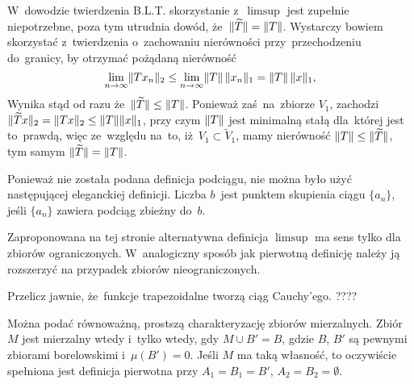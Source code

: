 \documentclass[a4paper,11pt]{article}
\numberwithin{equation}{section}
\begin{document}
\VerSpaceFour





\noindent
{} W~dowodzie twierdzenia B.L.T. skorzystanie z~$\limsup$
jest zupełnie niepotrzebne, poza tym utrudnia dowód,
że~$\Vert \widetilde{ T } \Vert = \lVert{  T  }\rVert$. Wystarczy bowiem skorzystać
z~twierdzenia o~zachowaniu nierówności przy~przechodzeniu do~granicy,
by otrzymać pożądaną nierówność
\begin{equation}
  \label{eq:RS-Vol-I-s01-13}
  \lim\limits_{ n \to \infty } \lVert{  T x_{ n }  }\rVert_{ 2 }
  \leq \lim\limits_{ n \to \infty } \lVert{  T  }\rVert \, \lVert{  x_{ n }  }\rVert_{ 1 }
  = \lVert{  T  }\rVert \, \lVert{  x  }\rVert_{ 1 },
\end{equation}
Wynika stąd od razu że~$\Vert \widetilde{ T } \Vert \leq \lVert{  T  }\rVert$. Ponieważ
zaś~na~zbiorze $V_{ 1 }$, zachodzi
$\Vert \widetilde{ T } x \Vert_{ 2 } = \lVert{  T x  }\rVert_{ 2 } \leq \lVert{  T  }\rVert \lVert{  x
 }\rVert_{ 1 }$, przy czym $\lVert{  T  }\rVert$ jest minimalną stałą dla~której jest
to~prawdą, więc ze~względu na~to, iż~$V_{ 1 } \subset \widetilde{ V }_{ 1 }$,
mamy nierówność $\lVert{  T  }\rVert \leq \Vert \widetilde{ T } \Vert$, tym samym
$\Vert \widetilde{ T } \Vert = \lVert{  T  }\rVert$. %

\VerSpaceFour





\noindent
{} Ponieważ nie została podana definicja podciągu, nie
można było użyć następującej eleganckiej definicji. Liczba $b$~jest
punktem skupienia ciągu $\{ a_{ n } \}$, jeśli $\{ a_{ n } \}$ zawiera
podciąg zbieżny do~$b$. %

\VerSpaceFour





\noindent
{} Zaproponowana na tej stronie alternatywna definicja
$\limsup$ ma sens tylko dla zbiorów ograniczonych. W~analogiczny
sposób jak pierwotną definicję należy ją rozszerzyć na przypadek
zbiorów nieograniczonych. %

\VerSpaceFour





\noindent
{} Przelicz jawnie, że~funkcje trapezoidalne tworzą ciąg
Cauchy'ego. ????

\VerSpaceFour





\noindent
{} Można podać równoważną, prostszą charakteryzację
zbiorów mierzalnych. Zbiór $M$ jest mierzalny wtedy i~tylko wtedy, gdy
$M \cup B' = B$, gdzie $B$, $B'$ są pewnymi zbiorami borelowskimi
i~$\mu( B' ) = 0$. Jeśli $M$ ma taką własność, to oczywiście spełniona
jest definicja pierwotna przy $A_{ 1 } = B_{ 1 } = B'$,
$A_{ 2 } = B_{ 2 } = \emptyset$.
\end{document}
